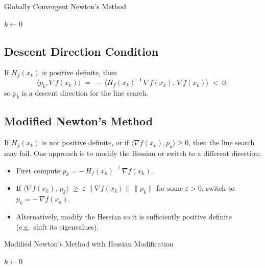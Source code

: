 \begin{algorithm}[H]
	\caption{Globally Convergent Newton's Method}
	\label{alg:newton-global}
	\(k \gets 0\)\;
	\;
\end{algorithm}

\subsection*{Descent Direction Condition}
If \(H_f(x_k)\) is positive definite, then
\[
	\langle p_k, \nabla f(x_k)\rangle
	\;=\;
	-\,\langle H_f(x_k)^{-1}\,\nabla f(x_k),\,\nabla f(x_k)\rangle
	\;<\; 0,
\]
so \(p_k\) is a descent direction for the line search.

\subsection*{Modified Newton's Method}
If \(H_f(x_k)\) is not positive definite, or if \(\langle \nabla f(x_k), p_k\rangle \geq 0\), then the line search may fail. One approach is to modify the Hessian or switch to a different direction:

\begin{itemize}
	\item First compute \(p_k = -\,H_f(x_k)^{-1}\,\nabla f(x_k)\).
	\item If \(\langle \nabla f(x_k),\,p_k\rangle \;\ge\; \varepsilon \,\|\nabla f(x_k)\|\,\|p_k\|\) for some \(\varepsilon > 0\), switch to \(p_k = -\,\nabla f(x_k)\).
	\item Alternatively, modify the Hessian so it is sufficiently positive definite (e.g.\ shift its eigenvalues).
\end{itemize}

\begin{algorithm}[H]
	\caption{Modified Newton's Method with Hessian Modification}
	\label{alg:newton-modified}
	\(k \gets 0\)\;
	\;
\end{algorithm}

